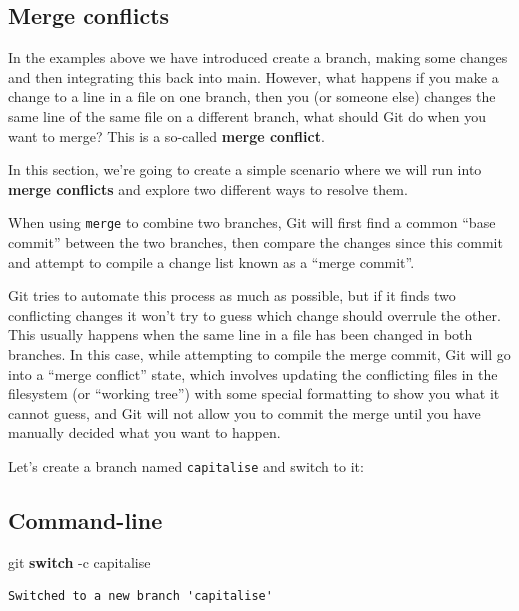 \documentclass[
  letterpaper,
  DIV=11,
  numbers=noendperiod]{scrartcl}
\newenvironment{Shaded}{\begin{snugshade}}{\end{snugshade}}
\newcommand{\ControlFlowTok}[1]{\textcolor[rgb]{0.00,0.23,0.31}{\textbf{#1}}}
\newcommand{\NormalTok}[1]{\textcolor[rgb]{0.00,0.23,0.31}{#1}}
\newcommand{\SpecialCharTok}[1]{\textcolor[rgb]{0.37,0.37,0.37}{#1}}
\begin{document}
\subsection{Merge conflicts}\label{merge-conflicts}

In the examples above we have introduced create a branch, making some
changes and then integrating this back into main. However, what happens
if you make a change to a line in a file on one branch, then you (or
someone else) changes the same line of the same file on a different
branch, what should Git do when you want to merge? This is a so-called
\textbf{merge conflict}.

In this section, we're going to create a simple scenario where we will
run into \textbf{merge conflicts} and explore two different ways to
resolve them.

When using \texttt{merge} to combine two branches, Git will first find a
common ``base commit'' between the two branches, then compare the
changes since this commit and attempt to compile a change list known as
a ``merge commit''.

Git tries to automate this process as much as possible, but if it finds
two conflicting changes it won't try to guess which change should
overrule the other. This usually happens when the same line in a file
has been changed in both branches. In this case, while attempting to
compile the merge commit, Git will go into a ``merge conflict'' state,
which involves updating the conflicting files in the filesystem (or
``working tree'') with some special formatting to show you what it
cannot guess, and Git will not allow you to commit the merge until you
have manually decided what you want to happen.

Let's create a branch named \texttt{capitalise} and switch to it:

\subsection{Command-line}

\begin{Shaded}
\begin{Highlighting}[]
\NormalTok{git }\ControlFlowTok{switch} \SpecialCharTok{{-}}\NormalTok{c capitalise}
\end{Highlighting}
\end{Shaded}

\begin{verbatim}
Switched to a new branch 'capitalise'
\end{verbatim}
\end{document}
